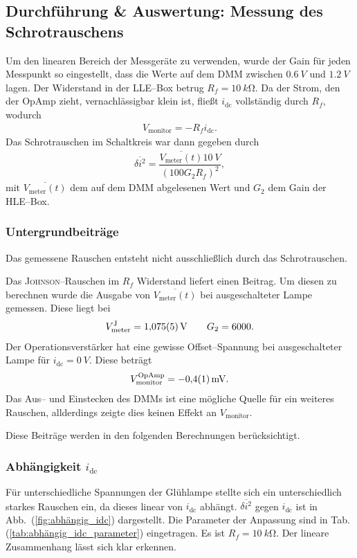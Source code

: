 \documentclass[sn-mathphys-num,iicol]{sn-jnl}
\theoremstyle{thmstyleone}
\theoremstyle{thmstyletwo}
\theoremstyle{thmstylethree}
\begin{document}
\subsection{Durchführung \& Auswertung: Messung des Schrotrauschens}
Um den linearen Bereich der Messgeräte zu verwenden, wurde der Gain für jeden Messpunkt so eingestellt, dass die Werte auf dem DMM zwischen $\SI{0.6}{V}$ und $\SI{1.2}{V}$ lagen.
Der Widerstand in der LLE--Box betrug $R_f=\SI{10}{k\ohm}$.
Da der Strom, den der OpAmp zieht, vernachlässigbar klein ist, fließt $i_\text{dc}$ vollständig durch $R_f$, wodurch
\begin{align}
	V_\text{monitor}=-R_fi_\text{dc}
	.\end{align}
Das Schrotrauschen im Schaltkreis war dann gegeben durch
\begin{align}
	\overline{\delta i^2}=\dfrac{\overline{V_\text{meter}(t)}\SI{10}{V}}{(100G_2R_f)^2}
	,\end{align}
mit $\overline{V_\text{meter}(t)}$ dem auf dem DMM abgelesenen Wert und $G_2$ dem Gain der HLE--Box.

\subsubsection{Untergrundbeiträge}
Das gemessene Rauschen entsteht nicht ausschließlich durch das Schrotrauschen.

Das \textsc{Johnson}--Rauschen im $R_f$ Widerstand liefert einen Beitrag.
Um diesen zu berechnen wurde die Ausgabe von $\overline{V_\text{meter}(t)}$ bei ausgeschalteter Lampe gemessen.
Diese liegt bei
\begin{align}
	V_\text{meter}^\text{J}=\SI{1.075+-0.005}{V}\qquad G_2=6000
	.\end{align}
Der Operationsverstärker hat eine gewisse Offset--Spannung bei ausgeschalteter Lampe für $i_\text{dc}=\SI{0}{V}$.
Diese beträgt
\begin{align}
	V_\text{monitor}^\text{OpAmp}=\SI{-0.4+-0.1}{mV} %
	.\end{align}
Das Aus-- und Einstecken des DMMs ist eine mögliche Quelle für ein weiteres Rauschen, allderdings zeigte dies keinen Effekt an $V_\text{monitor}$.

Diese Beiträge werden in den folgenden Berechnungen berücksichtigt.

\subsubsection{Abhängigkeit $i_\text{dc}$}
Für unterschiedliche Spannungen der Glühlampe stellte sich ein unterschiedlich starkes Rauschen ein, da dieses linear von $i_\text{dc}$ abhängt.
$\overline{\delta i^2}$ gegen $i_\text{dc}$ ist in Abb.\ (\ref{fig:abhängig_idc}) dargestellt.
Die Parameter der Anpassung sind in Tab. (\ref{tab:abhängig_idc_parameter}) eingetragen.
Es ist $R_f=\SI{10}{k\ohm}$.
Der lineare Zusammenhang lässt sich klar erkennen. %
\end{document}
